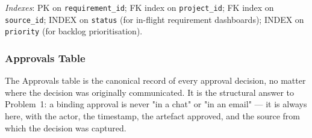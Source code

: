 \documentclass[12pt,a4paper]{report}
\begin{document}
\noindent \emph{Indexes}: PK on \texttt{requirement\_id}; FK index on
\texttt{project\_id}; FK index on \texttt{source\_id}; INDEX on
\texttt{status} (for in-flight requirement dashboards); INDEX on
\texttt{priority} (for backlog prioritisation).

\subsubsection{Approvals Table}
\label{tab:approvals}

The Approvals table is the canonical record of every approval decision, no
matter where the decision was originally communicated. It is the structural
answer to Problem~1: a binding approval is never "in a chat" or "in an email"
--- it is always here, with the actor, the timestamp, the artefact approved,
and the source from which the decision was captured.
\end{document}
